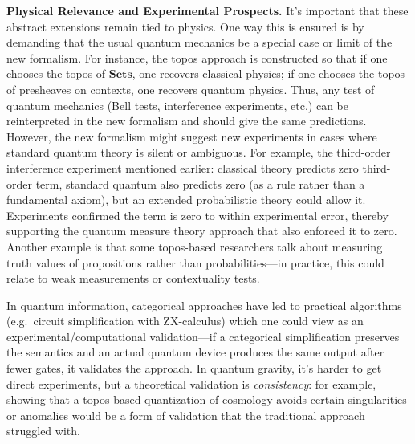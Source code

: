 \documentclass[12pt]{article}
\begin{document}
\medskip
\textbf{Physical Relevance and Experimental Prospects.} It’s important that these abstract extensions remain tied to physics. One way this is ensured is by demanding that the usual quantum mechanics be a special case or limit of the new formalism. For instance, the topos approach is constructed so that if one chooses the topos of $\mathbf{Sets}$, one recovers classical physics; if one chooses the topos of presheaves on contexts, one recovers quantum physics. Thus, any test of quantum mechanics (Bell tests, interference experiments, etc.) can be reinterpreted in the new formalism and should give the same predictions. However, the new formalism might suggest new experiments in cases where standard quantum theory is silent or ambiguous. For example, the third-order interference experiment mentioned earlier: classical theory predicts zero third-order term, standard quantum also predicts zero (as a rule rather than a fundamental axiom), but an extended probabilistic theory could allow it. Experiments confirmed the term is zero to within experimental error, thereby supporting the quantum measure theory approach that also enforced it to zero. Another example is that some topos-based researchers talk about measuring truth values of propositions rather than probabilities---in practice, this could relate to weak measurements or contextuality tests.

In quantum information, categorical approaches have led to practical algorithms (e.g.\ circuit simplification with ZX-calculus) which one could view as an experimental/computational validation---if a categorical simplification preserves the semantics and an actual quantum device produces the same output after fewer gates, it validates the approach. In quantum gravity, it’s harder to get direct experiments, but a theoretical validation is \emph{consistency}: for example, showing that a topos-based quantization of cosmology avoids certain singularities or anomalies would be a form of validation that the traditional approach struggled with.
\end{document}
